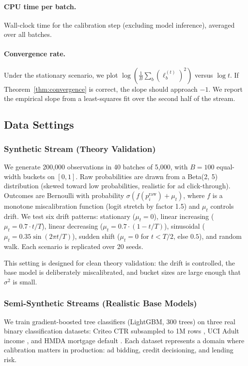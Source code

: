 \documentclass[12pt, letterpaper]{article}
\theoremstyle{definition}
\theoremstyle{remark}
\begin{document}
\paragraph{CPU time per batch.} Wall-clock time for the calibration step (excluding model inference), averaged over all batches.

\paragraph{Convergence rate.} Under the stationary scenario, we plot $\log(\frac{1}{B}\sum_b (\ell_b^{(t)})^2)$ versus $\log t$. If Theorem~\ref{thm:convergence} is correct, the slope should approach $-1$. We report the empirical slope from a least-squares fit over the second half of the stream.

\subsection{Data Settings}

\subsubsection{Synthetic Stream (Theory Validation)}

We generate 200,000 observations in 40 batches of 5,000, with $B = 100$ equal-width buckets on $[0, 1]$. Raw probabilities are drawn from a Beta(2, 5) distribution (skewed toward low probabilities, realistic for ad click-through). Outcomes are Bernoulli with probability $\sigma(f(p_i^{\mathrm{raw}}) + \mu_t)$, where $f$ is a monotone miscalibration function (logit stretch by factor 1.5) and $\mu_t$ controls drift. We test six drift patterns: stationary ($\mu_t = 0$), linear increasing ($\mu_t = 0.7 \cdot t/T$), linear decreasing ($\mu_t = 0.7 \cdot (1 - t/T)$), sinusoidal ($\mu_t = 0.35 \sin(2\pi t/T)$), sudden shift ($\mu_t = 0$ for $t < T/2$, else $0.5$), and random walk. Each scenario is replicated over 20 seeds.

This setting is designed for clean theory validation: the drift is controlled, the base model is deliberately miscalibrated, and bucket sizes are large enough that $\sigma^2$ is small.

\subsubsection{Semi-Synthetic Streams (Realistic Base Models)}

We train gradient-boosted tree classifiers (LightGBM, 300 trees) on three real binary classification datasets: Criteo CTR subsampled to 1M rows \citep{criteo2014}, UCI Adult income \citep{dua2019uci}, and HMDA mortgage default \citep{hmda2022}. Each dataset represents a domain where calibration matters in production: ad bidding, credit decisioning, and lending risk.
\end{document}
